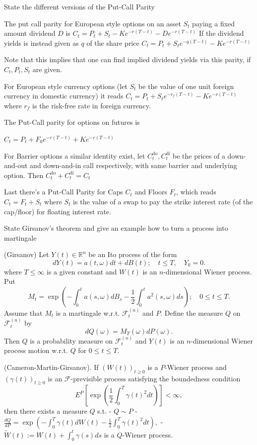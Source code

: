 State the different versions of the Put-Call Parity


The put call parity for European style options on an asset \( S_t \) paying a fixed amount dividend \( D \) is
\( C_t = P_t + S_t - Ke^{-r(T - t)} - De^{-r(T-t)} \)
If the dividend yields is instead given as \( q \) of the share price
\( C_t = P_t + S_t e^{-q(T - t)} - Ke^{-r(T - t)} \)

Note that this implies that one can find implied dividend yields via this parity, if \( C_t, P_t, S_t \) are given.

For European style currency options (let \( S_t \) be the value of one unit foreign currency in domestic currency) it reads
\( C_t = P_t + S_te^{-r_f (T - t)} - Ke^{-r(T-t)}  \)
where \( r_f \) is the risk-free rate in foreign currency.

The Put-Call parity for options on futures is

\( C_t = P_t + F_0 e^{-r(T-t)} + Ke^{-r(T-t)} \)

For Barrier options a similar identity exist, let \( C^{\text{do}}_t, C^{\text{di}}_t \) be the 
prices of a down-and-out and down-and-in call respectively, with same barrier and underlying option.
Then
\( C^{\text{do}}_t + C^{\text{di}}_t = C_t \)

Last there's a Put-Call Parity for Caps \( C_t \) and Floors \( F_t \), which reads
\( C_t = F_t + S_t \)
where \( S_t \) is the value of a swap to pay the strike interest rate (of the cap/floor) for floating interest rate.


State Girsanov's theorem and give an example how to turn a process into martingale


(Girsanov)
Let \( Y(t) \in \mathbb{R}^n \) be an Ito process of the form  
\[  
dY(t) = a(t, \omega) dt + dB(t); \quad t \leq T, \quad Y_0 = 0.  
\]  
where \( T \leq \infty \) is a given constant and \( W(t) \) is an \( n \)-dimensional Wiener process. Put  
\[  
M_t = \exp \left( -\int_0^t a(s, \omega) dB_s - \frac{1}{2} \int_0^t a^2(s, \omega) ds \right); \quad 0 \leq t \leq T.  
\]  
Assume that \( M_t \) is a martingale w.r.t. \( \mathcal{F}_t^{(n)} \) and \( P \). Define the measure \( Q \) on \( \mathcal{F}_t^{(n)} \) by  
\[  
dQ(\omega) = M_T(\omega) dP(\omega).  
\]  
Then \( Q \) is a probability measure on \( \mathcal{F}_t^{(n)} \) and \( Y(t) \) is an \( n \)-dimensional Wiener process motion w.r.t. \( Q \) for \( 0 \leq t \leq T \).  

(Cameron-Martin-Girsanov). 
If \( (W(t))_{t \geq 0} \) is a \( P \)-Wiener process and \( (\gamma(t))_{t \geq 0} \) is an \( \mathcal{F} \)-previsible process satisfying the boundedness condition  
\[  
E^P \left[ \exp \left( \frac{1}{2} \int_0^T \gamma(t)^2 dt \right) \right] < \infty,  
\]  
then there exists a measure \( Q \) s.t.  
- \( Q \sim P \)  
- \( \frac{dQ}{dP} = \exp \left( - \int_0^T \gamma(t) dW(t) - \frac{1}{2} \int_0^T \gamma(t)^2 dt \right), \)  
- \( \widetilde{W}(t) := W(t) + \int_0^t \gamma(s) ds \) is a \( Q \)-Wiener process.  

